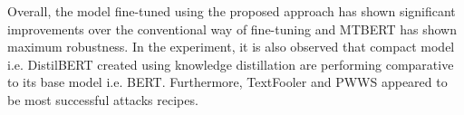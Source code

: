 \documentclass[%
	BCOR=8mm, %
	DIV=12,
	toc=bibliography, %
	toc=listof, %
	oneside, %
	egregdoesnotlikesansseriftitles, %
	]{scrbook}
\begin{document}
Overall, the model fine-tuned using the proposed approach has shown significant improvements over the conventional way of fine-tuning and MTBERT has shown maximum robustness. In the experiment, it is also observed that compact model i.e. DistilBERT created using knowledge distillation are performing comparative to its base model i.e. BERT. Furthermore, TextFooler and PWWS  appeared to be most successful attacks recipes. 

\newpage
\end{document}
